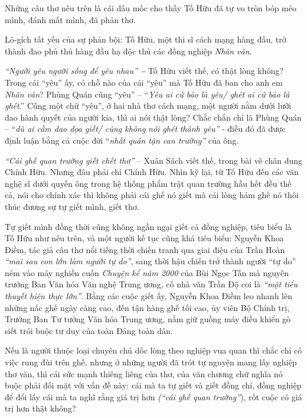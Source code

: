 \documentclass[../main.tex]{subfiles}
\begin{document}
\begin{multicols}{2}
Những câu thơ nêu trên là cái dấu mốc cho thấy Tố Hữu đã tự vo tròn bóp méo mình, đánh mất mình, đã phản thơ.  
 
Lô-gích tất yếu của sự phản bội: Tố Hữu, một thi sĩ cách mạng hàng đầu, trở thành đao phủ thủ hàng đầu hạ độc thủ các đồng nghiệp \textit{Nhân văn}. 
 
\textit{“Người yêu người sống để yêu nhau”\textbf{ – }}Tố Hữu viết thế, có thật lòng không? Trong cái “yêu” ấy, có chỗ nào của cái “yêu” mà Tố Hữu đã ban cho anh em \textit{Nhân văn}? Phùng Quán cũng “yêu” – “\textit{Yêu ai cứ bảo là yêu/ ghét ai cứ bảo là ghét}.” Cũng một chữ “yêu”, ở hai nhà thơ cách mạng, một người nằm dưới lưỡi dao hành quyết của người kia, thì ai nói thật lòng? Chắc chắn chỉ là Phùng Quán – “\textit{dù ai cầm dao dọa giết/ cũng không} \textit{nói ghét} \textit{thành yêu”} - điều đó đã được định luận bằng cả cuộc đời “\textit{nhất quán tận can trường”} của ông.  
 
\textit{“Cái ghế quan trường giết chết thơ”}  – Xuân Sách viết thế, trong bài vẽ chân dung Chính Hữu. Nhưng đâu phải chỉ Chính Hữu. Nhìn kỹ lại, từ Tố Hữu đến các văn nghệ sĩ dưới quyền ông trong hệ thống phẩm trật quan trường hầu hết đều thế cả, nói cho chính xác thì không phải cái ghế nó giết mà cái lòng hám ghế nó thôi thúc đương sự tự giết mình, giết thơ. 
 
Tự giết mình đồng thời cũng không ngần ngại giết cả đồng nghiệp, tiêu biểu là Tố Hữu như nêu trên, và một người kế tục cũng khá tiêu biểu: Nguyễn Khoa Điềm, tác giả câu thơ nổi tiếng thời chiến tranh qua giai điệu của Trần Hoàn \textit{“mai sau con lớn làm người tự do”}, sang thời hậu chiến trở thành người “tự do” ném vào máy nghiền cuốn \textit{Chuyện kể năm 2000} của Bùi Ngọc Tấn mà nguyên trưởng Ban Văn hóa Văn nghệ Trung ương, cố nhà văn Trần Độ coi là \textit{“một tiểu thuyết hiện thực lớn”}. Bằng các cuộc giết ấy, Nguyễn Khoa Điềm leo nhanh lên những nấc ghế ngày càng cao, đến tận hàng ghế tối cao, ủy viên Bộ Chính trị, Trưởng Ban Tư tưởng Văn hóa Trung ương, nắm giữ guồng máy điều khiển gò siết trói buộc tư duy của toàn Đảng toàn dân.	 
 
Nếu là người thuộc loại chuyên chú dốc lòng theo nghiệp vua quan thì chắc chỉ có việc rung đùi trên ghế, nhưng ở những người đã trót tự nguyện mang lấy nghiệp thơ văn, thì cái sức mạnh thiêng liêng của thơ, của văn chương chữ nghĩa nó buộc phải đối mặt với vấn đề này: cái mà ta tự giết và giết đồng chí, đồng nghiệp để đổi lấy cái mà ta nghĩ rằng giá trị hơn \textit{(“cái ghế quan} \textit{trường”}), rốt cuộc có giá trị hơn thật không? 
 

\end{multicols}
\end{document}
